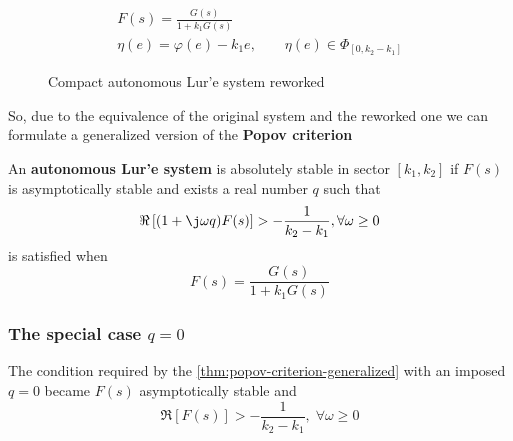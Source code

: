 \begin{gather*}
    F(s) = \frac{G(s)}{1+k_1 G(s)} \\
    \eta(e) = \varphi(e) - k_1 e, \qquad \eta(e) \in \Phi_{[0,k_2-k_1]}
\end{gather*}

\begin{figure}[htb]
    \centering
    \caption{Compact autonomous Lur'e system reworked}
    \label{fig:lure-system-reqworked-compact}
\end{figure}

So, due to the equivalence of the original system and the reworked one we can formulate a generalized version of the \textbf{Popov criterion}

\begin{theorem}\label{thm:popov-criterion-generalized}
    An \textbf{autonomous Lur'e system} is absolutely stable in sector $[k_1,k_2]$ if $F(s)$ is asymptotically stable and exists a real number $q$ such that
\[
    \Re \left[(1+\j \omega q) F(s)\right] > - \frac{1}{k_2-k_1}, \forall \omega \geq 0
\]
is satisfied when
\[
    F(s) = \frac{G(s)}{1+k_1 G(s)}
\]
\end{theorem}

\subsubsection{The special case $q=0$}

The condition required by the \cref{thm:popov-criterion-generalized} with an imposed $q=0$ became $F(s)$ asymptotically stable and
\[
    \Re \left[F(s)\right] > - \frac{1}{k_2-k_1}, \; \forall \omega \geq 0
\]

